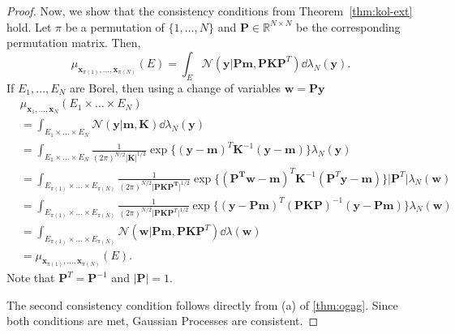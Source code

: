 \begin{proof}
    Now, we show that the consistency conditions from Theorem~\ref{thm:kol-ext} hold.
    Let $\pi$ be a permutation of $\{ 1, \dots, N \}$ and $\mathbf{P} \in \mathbb{R}^{N \times N}$ be the corresponding permutation matrix.
    Then,
    \begin{equation*}
        \mu_{\mathbf{x}_{\pi(1)}, \dots, \mathbf{x}_{\pi(N)}}(E) =
        \int_{E} \mathcal{N}(\mathbf{y} | \mathbf{Pm}, \mathbf{P} \mathbf{K} \mathbf{P}^{T}) \dd \lambda_N(\mathbf{y}).
    \end{equation*}
    If $E_1, \dots, E_N$ are Borel, then using a change of variables $\mathbf{w} = \mathbf{Py}$
    \begin{align*}
        & \mu_{\mathbf{x}_1, \dots, \mathbf{x}_N}(E_1 \times \dots \times E_N) \\
        & = \int_{E_1 \times \dots \times E_N} \mathcal{N}(\mathbf{y} | \mathbf{m}, \mathbf{K}) \dd \lambda_N(\mathbf{y}) \\
        & = \int_{E_1 \times \dots \times E_N}
        \frac{ 1 }{ (2 \pi)^{N/2} \lvert \mathbf{K} \rvert^{1/2} }
        \exp \{ (\mathbf{y} - \mathbf{m})^{T} \mathbf{K}^{-1} (\mathbf{y} - \mathbf{m}) \}
        \lambda_N(\mathbf{y}) \\
        & = \int_{E_{\pi(1)} \times \dots \times E_{\pi(N)}}
        \frac{ 1 }{ (2 \pi)^{N/2} \lvert \mathbf{PKP^T} \rvert^{1/2} }
        \exp \{ (\mathbf{P^Tw} - \mathbf{m})^{T} \mathbf{K}^{-1} (\mathbf{P}^{T}\mathbf{y} - \mathbf{m}) \}
        \lvert \mathbf{P}^{T} \rvert \lambda_N(\mathbf{w}) \\
        & = \int_{E_{\pi(1)} \times \dots \times E_{\pi(N)}}
        \frac{ 1 }{ (2 \pi)^{N/2} \lvert \mathbf{PKP}^T \rvert^{1/2} }
        \exp \{ (\mathbf{y} - \mathbf{Pm})^{T} (\mathbf{P}\mathbf{K} \mathbf{P})^{-1} (\mathbf{y} - \mathbf{P}\mathbf{m}) \} \lambda_N(\mathbf{w}) \\
        & = \int_{E_{\pi(1)} \times \dots \times E_{\pi(N)}}
        \mathcal{N}(\mathbf{w} | \mathbf{Pm}, \mathbf{P} \mathbf{K} \mathbf{P}^{T}) \dd \lambda(\mathbf{w}) \\
        &= \mu_{\mathbf{x}_{\pi(1)}, \dots, \mathbf{x}_{\pi(N)}}(E).
    \end{align*}
    Note that $\mathbf{P}^{T} = \mathbf{P}^{-1}$ and $\lvert \mathbf{P} \rvert = 1$.

    The second consistency condition follows directly from (a) of \ref{thm:ogag}.
    Since both conditions are met, Gaussian Processes are consistent.
\end{proof}

